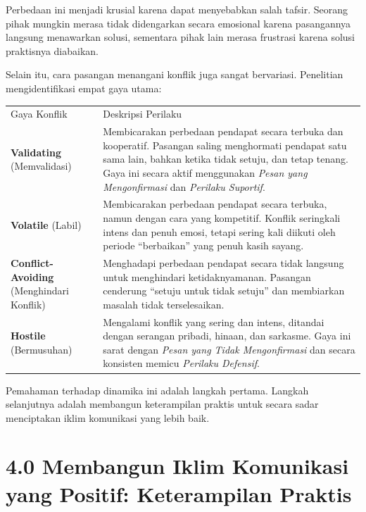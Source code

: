 \documentclass[
  letterpaper,
  DIV=11,
  numbers=noendperiod]{scrreprt}
\begin{document}
Perbedaan ini menjadi krusial karena dapat menyebabkan salah tafsir.
Seorang pihak mungkin merasa tidak didengarkan secara emosional karena
pasangannya langsung menawarkan solusi, sementara pihak lain merasa
frustrasi karena solusi praktisnya diabaikan.

Selain itu, cara pasangan menangani konflik juga sangat bervariasi.
Penelitian mengidentifikasi empat gaya utama:

\begin{longtable}[]{@{}
  >{\raggedright\arraybackslash}p{}
  >{\raggedright\arraybackslash}p{}@{}}
\toprule\noalign{}
\endhead
\bottomrule\noalign{}
\endlastfoot
Gaya Konflik & Deskripsi Perilaku \\
\textbf{Validating} (Memvalidasi) & Membicarakan perbedaan pendapat
secara terbuka dan kooperatif. Pasangan saling menghormati pendapat satu
sama lain, bahkan ketika tidak setuju, dan tetap tenang. Gaya ini secara
aktif menggunakan \emph{Pesan yang Mengonfirmasi} dan \emph{Perilaku
Suportif}. \\
\textbf{Volatile} (Labil) & Membicarakan perbedaan pendapat secara
terbuka, namun dengan cara yang kompetitif. Konflik seringkali intens
dan penuh emosi, tetapi sering kali diikuti oleh periode ``berbaikan''
yang penuh kasih sayang. \\
\textbf{Conflict-Avoiding} (Menghindari Konflik) & Menghadapi perbedaan
pendapat secara tidak langsung untuk menghindari ketidaknyamanan.
Pasangan cenderung ``setuju untuk tidak setuju'' dan membiarkan masalah
tidak terselesaikan. \\
\textbf{Hostile} (Bermusuhan) & Mengalami konflik yang sering dan
intens, ditandai dengan serangan pribadi, hinaan, dan sarkasme. Gaya ini
sarat dengan \emph{Pesan yang Tidak Mengonfirmasi} dan secara konsisten
memicu \emph{Perilaku Defensif}. \\
\end{longtable}

Pemahaman terhadap dinamika ini adalah langkah pertama. Langkah
selanjutnya adalah membangun keterampilan praktis untuk secara sadar
menciptakan iklim komunikasi yang lebih baik.

\section{\texorpdfstring{\textbf{4.0 Membangun Iklim Komunikasi yang
Positif: Keterampilan
Praktis}}{4.0 Membangun Iklim Komunikasi yang Positif: Keterampilan Praktis}}\label{membangun-iklim-komunikasi-yang-positif-keterampilan-praktis}
\end{document}
